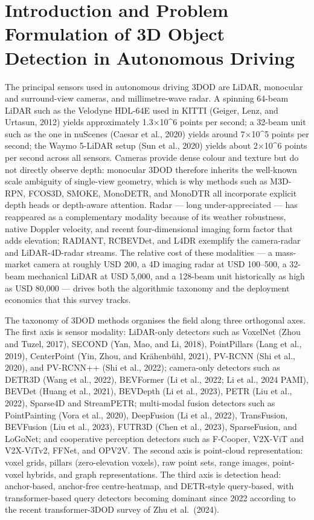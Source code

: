 \section{Introduction and Problem Formulation of 3D Object Detection in Autonomous Driving}\label{introduction-and-problem-formulation-of-3d-object-detection-in-autonomous-driving}

The principal sensors used in autonomous driving 3DOD are LiDAR, monocular and surround-view cameras, and millimetre-wave radar. A spinning 64-beam LiDAR such as the Velodyne HDL-64E used in KITTI (Geiger, Lenz, and Urtasun, 2012) yields approximately 1.3×10\^{}6 points per second; a 32-beam unit such as the one in nuScenes (Caesar et al., 2020) yields around 7×10\^{}5 points per second; the Waymo 5-LiDAR setup (Sun et al., 2020) yields about 2×10\^{}6 points per second across all sensors. Cameras provide dense colour and texture but do not directly observe depth: monocular 3DOD therefore inherits the well-known scale ambiguity of single-view geometry, which is why methods such as M3D-RPN, FCOS3D, SMOKE, MonoDETR, and MonoDTR all incorporate explicit depth heads or depth-aware attention. Radar --- long under-appreciated --- has reappeared as a complementary modality because of its weather robustness, native Doppler velocity, and recent four-dimensional imaging form factor that adds elevation; RADIANT, RCBEVDet, and L4DR exemplify the camera-radar and LiDAR-4D-radar streams. The relative cost of these modalities --- a mass-market camera at roughly USD 200, a 4D imaging radar at USD 100--500, a 32-beam mechanical LiDAR at USD 5,000, and a 128-beam unit historically as high as USD 80,000 --- drives both the algorithmic taxonomy and the deployment economics that this survey tracks.

The taxonomy of 3DOD methods organises the field along three orthogonal axes. The first axis is sensor modality: LiDAR-only detectors such as VoxelNet (Zhou and Tuzel, 2017), SECOND (Yan, Mao, and Li, 2018), PointPillars (Lang et al., 2019), CenterPoint (Yin, Zhou, and Krähenbühl, 2021), PV-RCNN (Shi et al., 2020), and PV-RCNN++ (Shi et al., 2022); camera-only detectors such as DETR3D (Wang et al., 2022), BEVFormer (Li et al., 2022; Li et al., 2024 PAMI), BEVDet (Huang et al., 2021), BEVDepth (Li et al., 2023), PETR (Liu et al., 2022), Sparse4D and StreamPETR; multi-modal fusion detectors such as PointPainting (Vora et al., 2020), DeepFusion (Li et al., 2022), TransFusion, BEVFusion (Liu et al., 2023), FUTR3D (Chen et al., 2023), SparseFusion, and LoGoNet; and cooperative perception detectors such as F-Cooper, V2X-ViT and V2X-ViTv2, FFNet, and OPV2V. The second axis is point-cloud representation: voxel grids, pillars (zero-elevation voxels), raw point sets, range images, point-voxel hybrids, and graph representations. The third axis is detection head: anchor-based, anchor-free centre-heatmap, and DETR-style query-based, with transformer-based query detectors becoming dominant since 2022 according to the recent transformer-3DOD survey of Zhu et al.~(2024).

